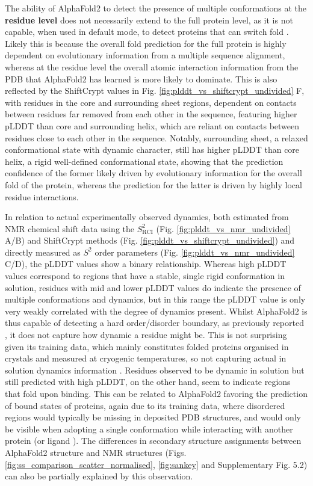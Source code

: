 The ability of AlphaFold2 to detect the presence of multiple conformations at the \textbf{residue level} does not necessarily extend to the full protein level, as it is not capable, when used in default mode, to detect proteins that can switch fold \cite{chakravarty_alphafold2_2022}. Likely this is because the overall fold prediction for the full protein is highly dependent on evolutionary information from a multiple sequence alignment, whereas at the residue level the overall atomic interaction information from the PDB that AlphaFold2 has learned is more likely to dominate. This is also reflected by the ShiftCrypt values in Fig. \ref{fig:plddt_vs_shiftcrypt_undivided} F, with residues in the core and surrounding sheet regions, dependent on contacts between residues far removed from each other in the sequence, featuring higher pLDDT than core and surrounding helix, which are reliant on contacts between residues close to each other in the sequence. Notably, surrounding sheet, a relaxed conformational state with dynamic character, still has higher pLDDT than core helix, a rigid well-defined conformational state, showing that the prediction confidence of the former likely driven by evolutionary information for the overall fold of the protein, whereas the prediction for the latter is driven by highly local residue interactions. 

In relation to actual experimentally observed dynamics, both estimated from NMR chemical shift data using the $S^{2}_{\text{RCI}}$ (Fig. \ref{fig:plddt_vs_nmr_undivided} A/B) and ShiftCrypt methods (Fig. \ref{fig:plddt_vs_shiftcrypt_undivided}) and directly measured as ${S^{2}}$ order parameters (Fig. \ref{fig:plddt_vs_nmr_undivided} C/D), the pLDDT values show a binary relationship. Whereas high pLDDT values correspond to regions that have a stable, single rigid conformation in solution, residues with mid and lower pLDDT values do indicate the presence of multiple conformations and dynamics, but in this range the pLDDT value is only very weakly correlated with the degree of dynamics present. Whilst AlphaFold2 is thus capable of detecting a hard order/disorder boundary, as previously reported \cite{piovesan_intrinsic_2022}, it does not capture how dynamic a residue might be. This is not surprising given its training data, which mainly constitutes folded proteins organised in crystals and measured at cryogenic temperatures, so not capturing actual in solution dynamics information \cite{fenwick_integrated_2014}. Residues observed to be dynamic in solution but still predicted with high pLDDT, on the other hand, seem to indicate regions that fold upon binding. This can be related to AlphaFold2 favoring the prediction of bound states of proteins, again due to its training data, where disordered regions would typically be missing in deposited PDB structures, and would only be visible when adopting a single conformation while interacting with another protein (or ligand \cite{saldano_impact_2022}). The differences in secondary structure assignments between AlphaFold2 structure and NMR structures (Figs. \ref{fig:ss_comparison_scatter_normalised},  \ref{fig:sankey} and Supplementary Fig. 5.2)
can also be partially explained by this observation.

